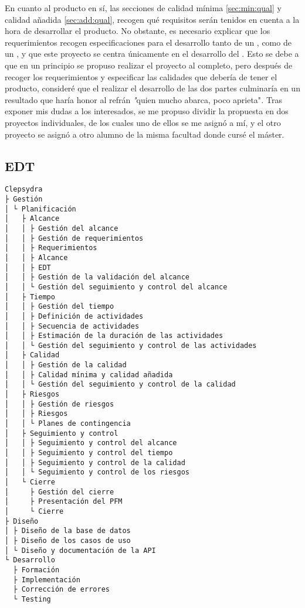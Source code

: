 En cuanto al producto en sí, las secciones de calidad mínima \ref{sec:min:qual}
y calidad añadida \ref{sec:add:qual}, recogen qué requisitos serán tenidos en
cuenta a la hora de desarrollar el producto. No obstante, es necesario explicar
que los requerimientos recogen especificaciones para el desarrollo tanto de
un , como de un , y que
este proyecto se centra únicamente en el desarrollo del
. Esto se debe a que en un principio se propuso
realizar el proyecto al completo, pero después de recoger los requerimientos
y especificar las calidades que debería de tener el producto, consideré que
el realizar el desarrollo de las dos partes culminaría en un resultado que
haría honor al refrán \textit"quien mucho abarca, poco aprieta"\textit. Tras
exponer mis dudas a los interesados, se me propuso dividir la propuesta en
dos proyectos individuales, de los cuales uno de ellos se me asignó a mí, y
el otro proyecto se asignó a otro alumno de la misma facultad donde cursé
el máster.

\subsection{EDT}
\begin{verbatim}
Clepsydra
├ Gestión
│ └ Planificación
│   ├ Alcance
│   │ ├ Gestión del alcance
│   │ ├ Gestión de requerimientos
│   │ ├ Requerimientos
│   │ ├ Alcance
│   │ ├ EDT
│   │ ├ Gestión de la validación del alcance
│   │ └ Gestión del seguimiento y control del alcance
│   ├ Tiempo
│   │ ├ Gestión del tiempo
│   │ ├ Definición de actividades
│   │ ├ Secuencia de actividades
│   │ ├ Estimación de la duración de las actividades
│   │ └ Gestión del seguimiento y control de las actividades
│   ├ Calidad
│   │ ├ Gestión de la calidad
│   │ ├ Calidad mínima y calidad añadida
│   │ └ Gestión del seguimiento y control de la calidad
│   ├ Riesgos
│   │ ├ Gestión de riesgos
│   │ ├ Riesgos
│   │ └ Planes de contingencia
│   ├ Seguimiento y control
│   │ ├ Seguimiento y control del alcance
│   │ ├ Seguimiento y control del tiempo
│   │ ├ Seguimiento y control de la calidad
│   │ └ Seguimiento y control de los riesgos
│   └ Cierre
│     ├ Gestión del cierre
│     ├ Presentación del PFM
│     └ Cierre
├ Diseño
│ ├ Diseño de la base de datos
│ ├ Diseño de los casos de uso
│ └ Diseño y documentación de la API
└ Desarrollo
  ├ Formación
  ├ Implementación
  ├ Corrección de errores
  └ Testing
\end{verbatim}

